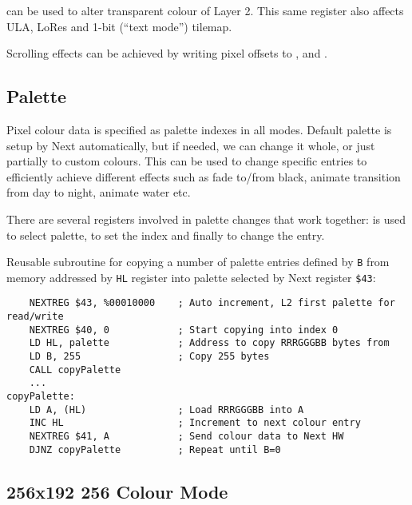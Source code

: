 \documentclass[12pt,twoside,openright,a4paper]{book}
\begin{document}
 can be used to alter transparent colour of Layer 2. This same register also affects ULA, LoRes and 1-bit (``text mode'') tilemap.

Scrolling effects can be achieved by writing pixel offsets to ,  and .


\subsection{Palette}

Pixel colour data is specified as palette indexes in all modes. Default palette is setup by Next automatically, but if needed, we can change it whole, or just partially to custom colours. This can be used to change specific entries to efficiently achieve different effects such as fade to/from black, animate transition from day to night, animate water etc.

There are several registers involved in palette changes that work together:  is used to select palette,  to set the index and finally  to change the entry.

Reusable subroutine for copying a number of palette entries defined by {\tt B} from memory addressed by {\tt HL} register into palette selected by Next register {\tt \$43}:

\begin{Verbatim}
	NEXTREG $43, %00010000    ; Auto increment, L2 first palette for read/write
	NEXTREG $40, 0            ; Start copying into index 0
	LD HL, palette            ; Address to copy RRRGGGBB bytes from
	LD B, 255                 ; Copy 255 bytes
	CALL copyPalette
	...
copyPalette:
	LD A, (HL)                ; Load RRRGGGBB into A
	INC HL                    ; Increment to next colour entry
	NEXTREG $41, A            ; Send colour data to Next HW
	DJNZ copyPalette          ; Repeat until B=0
\end{Verbatim}


\pagebreak
\subsection{256x192 256 Colour Mode}
\end{document}
